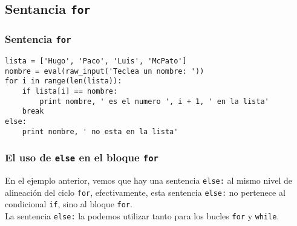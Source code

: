 \documentclass[12pt]{beamer}
\begin{document}
\subsection{Sentancia \texttt{for}}
\begin{frame}[fragile]
\frametitle{Sentencia \texttt{for}}
\begin{lstlisting}
lista = ['Hugo', 'Paco', 'Luis', 'McPato']
nombre = eval(raw_input('Teclea un nombre: '))
for i in range(len(lista)):
    if lista[i] == nombre:
    	print nombre, ' es el numero ', i + 1, ' en la lista'
    break
else:
    print nombre, ' no esta en la lista'
\end{lstlisting}
\end{frame}
\begin{frame}
\frametitle{El uso de \texttt{else} en el bloque \texttt{for}}
En el ejemplo anterior, vemos que hay una sentencia \texttt{else:} al mismo nivel de alineaci\'{o}n del ciclo \texttt{for}, efectivamente, esta sentencia \texttt{else:} no pertenece al condicional \texttt{if}, sino al bloque \texttt{for}.
\\
\medskip
La sentencia \texttt{else:} la podemos utilizar tanto para los bucles \texttt{for} y \texttt{while}.
\end{frame}
\end{document}
